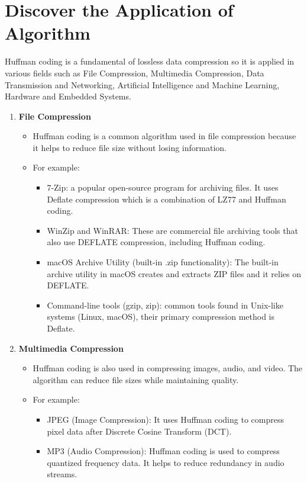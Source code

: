\section{Discover the Application of Algorithm}
Huffman coding is a fundamental of lossless data compression so it is applied in various fields such as File Compression, Multimedia Compression, Data Transmission and Networking, Artificial Intelligence and Machine Learning, Hardware and Embedded Systems.
\begin{enumerate}[label=\textbf{\Alph*.}]
    \item \textbf{File Compression}
    \begin{itemize}
    \item Huffman coding is a common algorithm used in file compression because it helps to reduce file size without losing information.
    \item For example:
        \begin{itemize}
            \item 7-Zip: a popular open-source program for archiving files. It uses Deflate compression which is a combination of LZ77 and Huffman coding.
            \item WinZip and WinRAR: These are commercial file archiving tools that also use DEFLATE compression, including Huffman coding.
            \item macOS Archive Utility (built-in .zip functionality): The built-in archive utility in macOS creates and extracts ZIP files and it relies on DEFLATE.
            \item Command-line tools (gzip, zip): common tools found in Unix-like systems (Linux, macOS), their primary compression method is Deflate.
        \end{itemize}
    \end{itemize}
    \item \textbf{Multimedia Compression}
    \begin{itemize}
    \item Huffman coding is also used in compressing images, audio, and video. The \\algorithm can reduce file sizes while maintaining quality.
    \item For example:
        \begin{itemize}
            \item JPEG (Image Compression): It uses Huffman coding to compress pixel data after Discrete Cosine Transform (DCT).
            \item MP3 (Audio Compression): Huffman coding is used to compress quantized frequency data. It helps to reduce redundancy in audio streams.

\end{itemize}
\end{itemize}
\end{enumerate}
